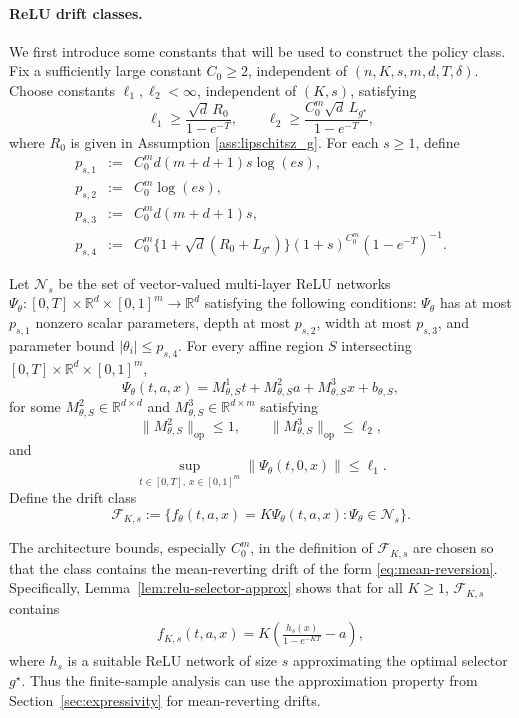 \documentclass{article}
\newcommand{\1}{\mathbbm{1}}
\numberwithin{equation}{section}
\def\to{\rightarrow}
\begin{document}
\paragraph{ReLU drift classes.}
We first introduce some constants that will be used to construct the policy class. 
Fix a sufficiently large  constant \(C_0\ge2\), independent of \((n,K,s,m,d,T,\delta)\). Choose constants \(\ell_1,\ell_2<\infty\), independent of \((K,s)\), satisfying
\begin{equation}
\label{eq:ell-lower-section4}
 \ell_1\ge \frac{\sqrt d\,R_0}{1-e^{-T}},
 \qquad
 \ell_2\ge \frac{C_0^m\sqrt d\,L_{g^\star}}{1-e^{-T}},
\end{equation}
where  $R_0$ is given in Assumption 
\ref{ass:lipschitsz_g}.
For each \(s\ge1\), define
\begin{eqnarray}
 p_{s,1}&:= &C_0^m d(m+d+1)s\log(e s),\label{eq:p-s-1-section4}\\
 p_{s,2}&:=&C_0^m\log(e s),\label{eq:p-s-2-section4}\\
 p_{s,3}&:=&C_0^m d(m+d+1)s,\label{eq:p-s-3-section4}\\
 p_{s,4}&:=&C_0^m\{1+\sqrt d(R_0+L_{g^\star})\}(1+s)^{C_0^m}(1-e^{-T})^{-1}.
\label{eq:p-s-4-section4}
\end{eqnarray}

Let \(\mathcal N_s\) be the set of vector-valued multi-layer ReLU networks
\(\Psi_\theta:[0,T]\times\mathbb R^d\times[0,1]^m\to\mathbb R^d\) satisfying the following conditions: $\Psi_\theta$ has at most \(p_{s,1}\) nonzero scalar parameters, depth at most \(p_{s,2}\), width at most \(p_{s,3}\), and parameter bound \(|\theta_i|\le p_{s,4}\). For every affine region \(S\) intersecting \([0,T]\times\mathbb R^d\times[0,1]^m\),
\begin{equation}
\label{eq:affine-piece-section4}
\Psi_\theta(t,a,x)=M^1_{\theta,S}t+M^2_{\theta,S}a+M^3_{\theta,S}x+b_{\theta,S},
\end{equation}
for some  \(M^2_{\theta,S}\in\mathbb R^{d\times d}\) and \(M^3_{\theta,S}\in\mathbb R^{d\times m}\) satisfying  
\[
\|M^2_{\theta,S}\|_{\mathrm{op}}\le1,
\qquad
\|M^3_{\theta,S}\|_{\mathrm{op}}\le\ell_2,
\]
and
\[
\sup_{t\in[0,T],\,x\in[0,1]^m}\|\Psi_\theta(t,0,x)\|\le \ell_1.
\]
Define the drift class
\begin{equation}
\label{eq:relu-drift-class-section4}
 \mathcal F_{K,s}:=\Big\{f_\theta(t,a,x)=K\Psi_\theta(t,a,x):\Psi_\theta\in\mathcal N_s\Big\}.
\end{equation}


The architecture bounds, especially $C^m_0$, in the definition of \(\mathcal F_{K,s}\) are chosen so that the class contains the mean-reverting drift of the form \eqref{eq:mean-reversion}.  %
Specifically, Lemma~\ref{lem:relu-selector-approx}   shows that
for all $K\ge 1$,
\(\mathcal F_{K,s}\) contains 
\begin{eqnarray}\label{eq:comp-section4}
    f_{K,s}(t,a,x)
=
K\left(\frac{h_s(x)}{1-e^{-KT}}-a\right),
\end{eqnarray}
where  $h_s$ is  a suitable ReLU network of size $s$
 approximating the optimal selector \(g^\star\). Thus the finite-sample analysis can use the approximation property from Section~\ref{sec:expressivity} for mean-reverting drifts. 
 
\end{document}

